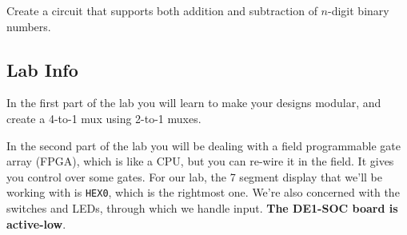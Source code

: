 \begin{exercise}
Create a circuit that supports both addition and subtraction of $n$-digit binary numbers.
\end{exercise}

\subsection*{Lab Info}

In the first part of the lab you will learn to make your designs modular, and create a 4-to-1 mux using 2-to-1 muxes.

In the second part of the lab you will be dealing with a field programmable gate array (FPGA), which is like a CPU, but you can re-wire it in the field. It gives you control over some gates. For our lab, the 7 segment display that we'll be working with is \texttt{HEX0}, which is the rightmost one. We're also concerned with the switches and LEDs, through which we handle input. \textbf{The DE1-SOC board is active-low}.

